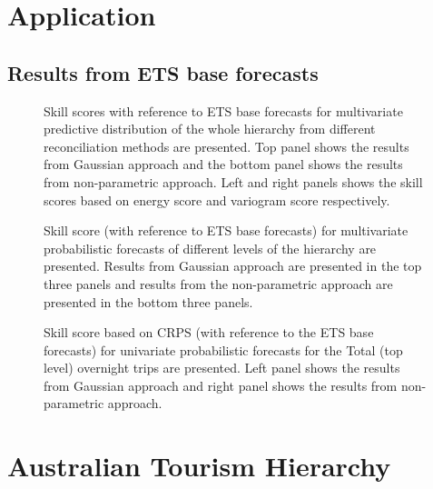 \documentclass[12pt]{article}
\theoremstyle{definition}
\begin{document}
\section{Application}

\subsection{Results from ETS base forecasts}

\begin{figure}[!hbt]
	\centering
	\small
	\caption{Skill scores with reference to ETS base forecasts for multivariate predictive distribution of the whole hierarchy from different reconciliation methods are presented. Top panel shows the results from Gaussian approach and the bottom panel shows the results from non-parametric approach. Left and right panels shows the skill scores based on energy score and variogram score respectively.}\label{fig:EmpResults_AllTS_ETS}
\end{figure}

\begin{figure}[!hbt]
	\centering
	\small
	\caption{Skill score (with reference to ETS base forecasts) for multivariate probabilistic forecasts of different levels of the hierarchy are presented. Results from Gaussian approach are presented in the top three panels and results from the non-parametric approach are presented in the bottom three panels.}\label{fig:EmpResults_Levels_ETS}
\end{figure}

\begin{figure}[!hbt]
	\centering
	\small
	\caption{Skill score based on CRPS (with reference to the ETS base forecasts) for univariate probabilistic forecasts for the Total (top level) overnight trips are presented. Left panel shows the results from Gaussian approach and right panel shows the results from non-parametric approach. }\label{fig:EmpResults_TopLevel_ETS}
\end{figure}

\FloatBarrier

\clearpage

\section{Australian Tourism Hierarchy}\label{app:AustralianData}
\end{document}
